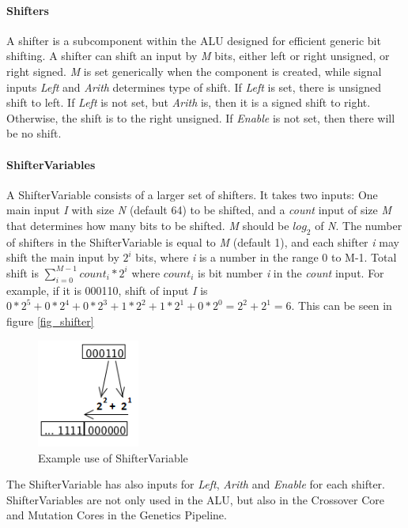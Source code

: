 \paragraph{Shifters}

A shifter is a subcomponent within the ALU designed for efficient generic bit shifting.
A shifter can shift an input by \emph{M} bits, either left or right unsigned, or right signed. \emph{M} is set generically when the component is created, while signal inputs  \emph{Left} and \emph{Arith} determines type of shift. 
If \emph{Left} is set, there is unsigned shift to left.
If \emph{Left} is not set, but \emph{Arith} is, then it is a signed shift to right.
Otherwise, the shift is to the right unsigned.
If \emph{Enable} is not set, then there will be no shift.

\paragraph{ShifterVariables}
A ShifterVariable consists of a larger set of shifters. 
It takes two inputs: One main input \emph{I} with size \emph{N} (default 64) to be shifted, and a \emph{count} input of size \emph{M} that determines how many bits to be shifted. 
\emph{M} should be $log_2$ of \emph{N}. 
The number of shifters in the ShifterVariable is equal to \emph{M} (default 1), and each shifter \emph{i} may shift the main input by $2^i$ bits, where \emph{i} is a number in the range 0 to M-1. 
Total shift is $\sum_{i=0}^{M-1} count_i * 2^i$ where $count_i$ is bit number \emph{i} in the \emph{count} input.
For example, if it is 000110, shift of input \emph{I} is $0*2^5 + 0*2^4 + 0*2^3 + 1*2^2 + 1*2^1 + 0*2^0 = 2^2 + 2^1 = 6$.
This can be seen in figure \vref{fig_shifter}
\begin{figure}[H]
\center
\includegraphics[width=0.3\textwidth]{fpga/fig/shift.png}
\caption{Example use of ShifterVariable}
\label{fig_shifter}
\end{figure}

The ShifterVariable has also inputs for \emph{Left}, \emph{Arith} and \emph{Enable} for each shifter.
ShifterVariables are not only used in the ALU, but also in the Crossover Core and Mutation Cores in the Genetics Pipeline.

